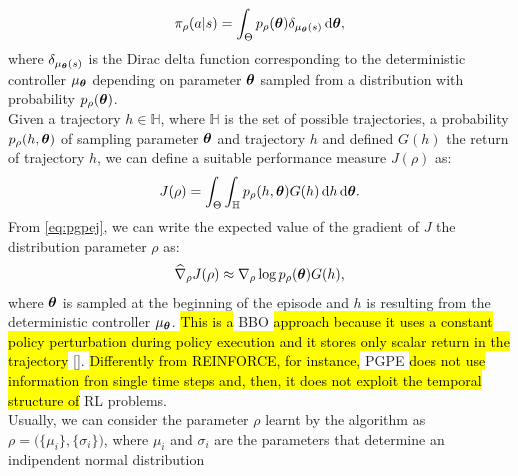 \begin{align}
\pi_{\rho}(a|s) = \int_{\Theta} p_{\rho}(\boldsymbol{\theta}) \delta_{\mu_{\boldsymbol{\theta}}(s)}\,\mathrm{d} \boldsymbol{\theta},
\end{align}
where $\delta_{\mu_{\boldsymbol{\theta}}(s)}$ is the Dirac delta function corresponding to the deterministic controller $\mu_{\boldsymbol{\theta}}$ depending on parameter $\boldsymbol{\theta}$ sampled from a distribution with probability $p_{\rho}(\boldsymbol{\theta})$.\\
\newline
Given a trajectory $h \in \mathbb{H}$, where $\mathbb{H}$ is the set of possible trajectories, a probability $p_{\rho}(h, \boldsymbol{\theta})$ of sampling parameter $\boldsymbol{\theta}$ and trajectory $h$ and defined $G(h)$ the return of trajectory $h$, we can define a suitable performance measure $J(\rho)$ as:
\begin{align}
J(\rho) = \int_{\Theta} \int_{\mathbb{H}} p_{\rho}(h, \boldsymbol{\theta}) G(h) \,\mathrm{d} h \,\mathrm{d} \boldsymbol{\theta}. \label{eq:pgpej}
\end{align}
From \ref{eq:pgpej}, we can write the expected value of the gradient of $J$ \wrt the distribution parameter $\rho$ as:
\begin{align}
\widehat{\nabla}_{\rho}J(\rho) \approx \nabla_{\rho} \log p_{\rho} (\boldsymbol{\theta}) G(h),
\end{align}
where $\boldsymbol{\theta}$ is sampled at the beginning of the episode and $h$ is resulting from the deterministic controller $\mu_{\boldsymbol{\theta}}$. \hl{This is a} \acf{BBO} \hl{approach because it uses a constant policy perturbation during policy execution and it stores only scalar return in the trajectory} [\cite{stulp2012pol}]. \hl{Differently from REINFORCE, for instance,} \ac{PGPE} \hl{does not use information fron single time steps and, then, it does not exploit the temporal structure of} \ac{RL} problems.\\
\newline
Usually, we can consider the parameter $\rho$ learnt by the algorithm as $\rho = \Big( \{\mu_i\}, \{\sigma_i\} \Big)$, where $\mu_i$ and $\sigma_i$ are the parameters that determine an indipendent normal distribution
